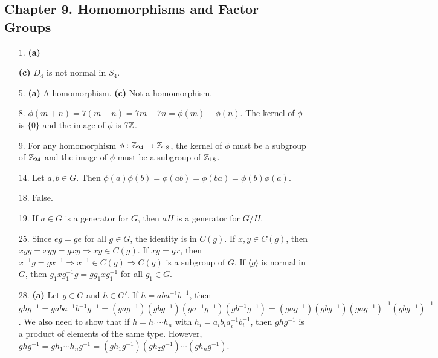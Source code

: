 \subsection*{Chapter 9. Homomorphisms and Factor Groups}
 
{\small
\begin{itemize}
 
\bf\item[1.]\rm
{\bf (a)}
\raisebox{-11.75pt}{\parbox{3in}{
\[
\begin{array}{c|cc}
         & A_4 & (12)A_4  \\
\hline
A_4      & A_4 & (12) A_4
\\
(12) A_4 & (12) A_4 & A_4
\end{array}
\]
}}

{\bf (c)} $D_4$ is not normal in $S_4$.
 
 
\bf\item[5.]\rm
{\bf (a)} A homomorphism.
{\bf (c)} Not a homomorphism.
 
 
\bf\item[8.]\rm
$\phi(m + n) = 7(m+n) = 7m + 7n = \phi(m) + \phi(n)$. The kernel of
$\phi$ is $\{ 0 \}$ and the image of $\phi$ is $7{\Bbb Z}$.
 
 
\bf\item[9.]\rm
For any homomorphism $\phi : {\Bbb Z}_{24} \rightarrow {\Bbb
Z}_{18}$, the kernel of $\phi$ must be a subgroup of ${\Bbb Z}_{24}$
and the image of $\phi$ must be a subgroup of ${\Bbb Z}_{18}$.
 
 
\bf\item[14.]\rm
Let $a, b \in G$. Then $\phi(a) \phi(b) = \phi(ab) = \phi(ba) =
\phi(b)\phi(a)$. 
 
\bf\item[18.]\rm
False.
 
\bf\item[19.]\rm
If $a \in G$ is a generator for $G$, then $aH$ is a generator for $G/H$.
 
\bf\item[25.]\rm
Since $eg = ge$ for all $g \in G$, the identity is in $C(g)$. If $x,
y \in C(g)$, then $xy g = x g y = g xy \Rightarrow xy \in C(g)$.  If
$x g = g x$, then $x^{-1} g = g x^{-1} \Rightarrow x^{-1} \in C(g)
\Rightarrow C(g)$ is a subgroup of $G$. If $\langle g \rangle$ is
normal in $G$, then $g_1 x g_1^{-1} g = g g_1 x g_1^{-1}$ for all $g_1
\in G$.
 
\bf\item[28.]\rm
{\bf (a)}
Let $g \in G$ and $h \in G'$. If $h = aba^{-1}b^{-1}$, then $ghg^{-1}
= gaba^{-1}b^{-1}g^{-1} 
= (gag^{-1})(gbg^{-1})(ga^{-1}g^{-1})(gb^{-1}g^{-1}) 
= (gag^{-1})(gbg^{-1})(gag^{-1})^{-1}(gbg^{-1})^{-1}$. We also need to
show that if $h = h_1 \cdots h_n$ with $h_i = a_i b_i a_i^{-1}
b_i^{-1}$, then $ghg^{-1}$ is a product of elements of the same type.
However, $ghg^{-1} = g h_1 \cdots h_n g^{-1} =
(gh_1g^{-1})(gh_2g^{-1}) \cdots (gh_ng^{-1})$.
 
 
 
 
\end{itemize}
}
 

